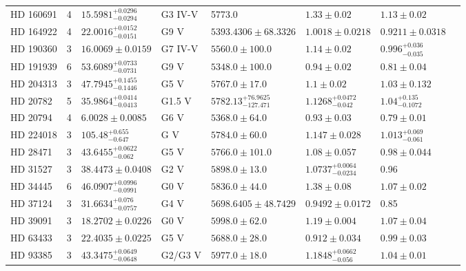 \begin{tabular}{lrllllll}
HD 160691 & 4 & $15.5981^{+0.0296}_{-0.0294}$ & G3 IV-V & 5773.0 & $1.33 \pm 0.02$ & $1.13 \pm 0.02$ & \cite{BENEDICT_ET_AL__2022} \\
HD 164922 & 4 & $22.0016^{+0.0152}_{-0.0151}$ & G9 V & $5393.4306 \pm 68.3326$ & $1.0018 \pm 0.0218$ & $0.9211 \pm 0.0318$ & \cite{ROSENTHAL_ET_AL__2021} \\
HD 190360 & 3 & $16.0069 \pm 0.0159$ & G7 IV-V & $5560.0 \pm 100.0$ & $1.14 \pm 0.02$ & $0.996^{+0.036}_{-0.035}$ & \cite{GIOVINAZZI_ET_AL_2026} \\
HD 191939 & 6 & $53.6089^{+0.0733}_{-0.0731}$ & G9 V & $5348.0 \pm 100.0$ & $0.94 \pm 0.02$ & $0.81 \pm 0.04$ & \cite{LUBIN_ET_AL__2022} \\
HD 204313 & 3 & $47.7945^{+0.1455}_{-0.1446}$ & G5 V & $5767.0 \pm 17.0$ & $1.1 \pm 0.02$ & $1.03 \pm 0.132$ & \cite{XIAO_ET_AL__2023} \\
HD 20782 & 5 & $35.9864^{+0.0414}_{-0.0413}$ & G1.5 V & $5782.13^{+76.9625}_{-127.471}$ & $1.1268^{+0.0472}_{-0.042}$ & $1.04^{+0.135}_{-0.1072}$ & \cite{STASSUN_ET_AL__2019} \\
HD 20794 & 4 & $6.0028 \pm 0.0085$ & G6 V & $5368.0 \pm 64.0$ & $0.93 \pm 0.03$ & $0.79 \pm 0.01$ & \cite{NARI_ET_AL_2025} \\
HD 224018 & 3 & $105.48^{+0.655}_{-0.647}$ & G V & $5784.0 \pm 60.0$ & $1.147 \pm 0.028$ & $1.013^{+0.069}_{-0.061}$ & \cite{DAMASSO_ET_AL_2025} \\
HD 28471 & 3 & $43.6455^{+0.0622}_{-0.062}$ & G5 V & $5766.0 \pm 101.0$ & $1.08 \pm 0.057$ & $0.98 \pm 0.044$ & \cite{STEVENSON_ET_AL_2025} \\
HD 31527 & 3 & $38.4473 \pm 0.0408$ & G2 V & $5898.0 \pm 13.0$ & $1.0737^{+0.0064}_{-0.0234}$ & 0.96 & \cite{UDRY_ET_AL__2019} \\
HD 34445 & 6 & $46.0907^{+0.0996}_{-0.0991}$ & G0 V & $5836.0 \pm 44.0$ & $1.38 \pm 0.08$ & $1.07 \pm 0.02$ & \cite{VOGT_ET_AL__2017} \\
HD 37124 & 3 & $31.6634^{+0.076}_{-0.0757}$ & G4 V & $5698.6405 \pm 48.7429$ & $0.9492 \pm 0.0172$ & 0.85 & \cite{ROSENTHAL_ET_AL__2021} \\
HD 39091 & 3 & $18.2702 \pm 0.0226$ & G0 V & $5998.0 \pm 62.0$ & $1.19 \pm 0.004$ & $1.07 \pm 0.04$ & \cite{HATZES_ET_AL__2022} \\
HD 63433 & 3 & $22.4035 \pm 0.0225$ & G5 V & $5688.0 \pm 28.0$ & $0.912 \pm 0.034$ & $0.99 \pm 0.03$ & \cite{CAPISTRANT_ET_AL_2024} \\
HD 93385 & 3 & $43.3475^{+0.0649}_{-0.0648}$ & G2/G3 V & $5977.0 \pm 18.0$ & $1.1848^{+0.0662}_{-0.056}$ & $1.04 \pm 0.01$ & \cite{UNGER_ET_AL__2021} \\

\end{tabular}
